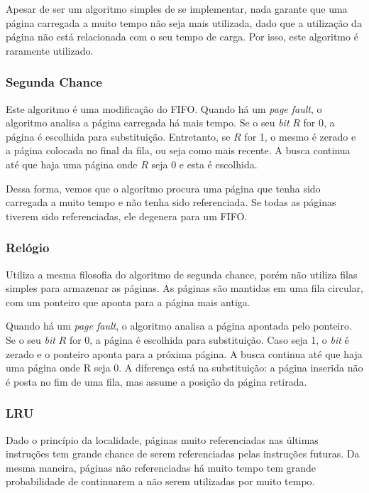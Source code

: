 Apesar de ser um algoritmo simples de se implementar, nada garante que uma página carregada a muito tempo não seja mais utilizada, dado que a utilização da página não está relacionada com o seu tempo de carga. Por isso, este algoritmo é raramente utilizado.




\subsubsection{Segunda Chance}
Este algoritmo é uma modificação do FIFO. Quando há um \textit{page fault}, o algoritmo analisa a página carregada há mais tempo. Se o seu \textit{bit} $R$ for 0, a página é escolhida para substituição. Entretanto, se $R$ for 1, o mesmo é zerado e a página colocada no final da fila, ou seja como mais recente. A busca continua até que haja uma página onde $R$ seja 0 e esta é escolhida.

Dessa forma, vemos que o algoritmo procura uma página que tenha sido carregada a muito tempo e não tenha sido referenciada. Se todas as páginas tiverem sido referenciadas, ele degenera para um FIFO.


\subsubsection{Relógio}
Utiliza a mesma filosofia do algoritmo de segunda chance, porém não utiliza filas simples para armazenar as páginas. As páginas são mantidas em uma fila circular, com um ponteiro que aponta para a página mais antiga.

Quando há um \textit{page fault}, o algoritmo analisa a página apontada pelo ponteiro. Se o seu \textit{bit} $R$ for 0, a página é escolhida para substituição. Caso seja 1, o \textit{bit} é zerado e o ponteiro aponta para a próxima página. A busca continua até que haja uma página onde R seja 0. A diferença está na substituição: a página inserida não é posta no fim de uma fila, mas assume a posição da página retirada.



\subsubsection{LRU}
Dado o princípio da localidade, páginas muito referenciadas nas últimas instruções tem grande chance de serem referenciadas pelas instruções futuras. Da mesma maneira, páginas não referenciadas há muito tempo tem grande probabilidade de continuarem a não serem utilizadas por muito tempo.

